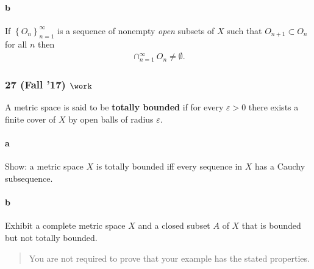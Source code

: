 \hypertarget{b-4}{%
\paragraph{b}\label{b-4}}

If \(\left\{{O_n}\right\}_{n=1}^\infty\) is a sequence of nonempty
\emph{open} subsets of \(X\) such that \(O_{n+1} \subset O_n\) for all
\(n\) then
\begin{align*}\cap_{n=1}^\infty O_{n}\neq \emptyset.\end{align*}

\hypertarget{fall-17-work-1}{%
\subsubsection{\texorpdfstring{27 (Fall '17)
\(\work\)}{27 (Fall '17) \textbackslash work}}\label{fall-17-work-1}}

A metric space is said to be \textbf{totally bounded} if for every
\(\varepsilon> 0\) there exists a finite cover of \(X\) by open balls of
radius \(\varepsilon\).

\hypertarget{a-5}{%
\paragraph{a}\label{a-5}}

Show: a metric space \(X\) is totally bounded iff every sequence in
\(X\) has a Cauchy subsequence.

\hypertarget{b-5}{%
\paragraph{b}\label{b-5}}

Exhibit a complete metric space \(X\) and a closed subset \(A\) of \(X\)
that is bounded but not totally bounded.

\begin{quote}
You are not required to prove that your example has the stated
properties.
\end{quote}

